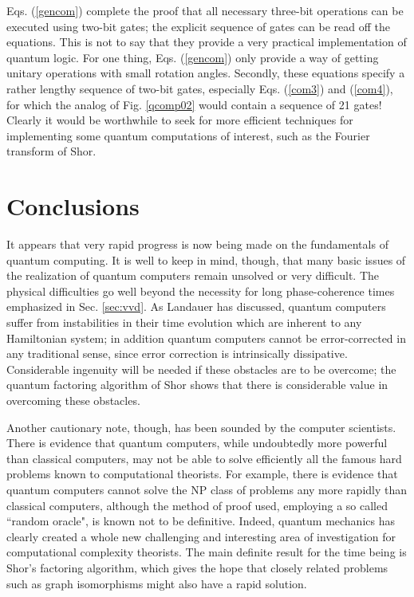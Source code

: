 Eqs. (\ref{gencom}) complete the proof that all necessary three-bit
operations
can be executed using two-bit gates; the explicit sequence of gates can be
read off the equations.  This is not to say that they provide a very
practical
implementation of quantum logic.  For one thing, Eqs. (\ref{gencom}) only
provide a way of getting unitary operations with small rotation angles.
Secondly, these equations specify a rather lengthy sequence of two-bit
gates, especially Eqs. (\ref{com3}) and (\ref{com4}), for which the
analog of Fig. \ref{qcomp02} would contain a sequence of 21 gates!
Clearly it would be worthwhile to seek for more efficient techniques
for implementing some quantum computations of interest, such as the
Fourier transform of Shor.

\section{Conclusions}
\label{conc}

It appears that very rapid progress is now being made on the fundamentals
of quantum computing.  It is well to keep in mind, though, that many basic
issues of the realization of quantum computers remain unsolved or very
difficult.  The physical difficulties go well beyond the
necessity for long phase-coherence times emphasized in Sec. \ref{sec:vvd}.
As Landauer has discussed\cite{Landaue}, quantum computers suffer from
instabilities in their time evolution which are inherent to any Hamiltonian
system; in addition quantum computers cannot be error-corrected in any
traditional sense, since error correction is intrinsically
dissipative.  Considerable ingenuity will be needed if these obstacles
are to be overcome; the quantum factoring algorithm of Shor shows that
there is considerable value in overcoming these obstacles.

Another cautionary note, though, has been sounded by the computer
scientists.
There is evidence that quantum computers, while
undoubtedly more powerful than classical computers, may not be able to
solve efficiently all the famous hard problems
known to computational theorists.
For example, there is evidence that quantum computers cannot solve the
NP class of problems\cite{CHB} any more rapidly than classical computers,
although the method of proof used, employing
a so called ``random oracle", is known not to be definitive.  Indeed,
quantum mechanics has clearly created a whole new challenging and
interesting area of investigation for computational complexity theorists.
The main definite result for the time being is Shor's factoring algorithm,
which gives the hope that closely related problems such as graph
isomorphisms\cite{Shorpriv} might also have a rapid solution.

